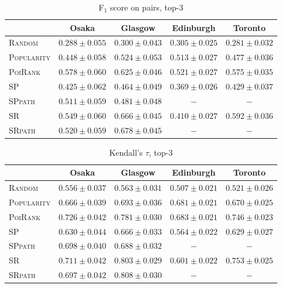 \begin{table*}[t]
\caption{F$_1$ score on pairs, top-3}
\label{tab:pf1}
\centering
\begin{tabular}{l|cccc} \hline
 & Osaka & Glasgow & Edinburgh & Toronto \\ \hline
\textsc{Random} & $0.288\pm0.055$ & $0.300\pm0.043$ & $0.305\pm0.025$ & $0.281\pm0.032$ \\
\textsc{Popularity} & $0.448\pm0.058$ & $0.524\pm0.053$ & $\mathit{0.513\pm0.027}$ & $0.477\pm0.036$ \\
\textsc{PoiRank} & $\mathbf{0.578\pm0.060}$ & $0.625\pm0.046$ & $\mathbf{0.521\pm0.027}$ & $\mathit{0.575\pm0.035}$ \\
\textsc{SP} & $0.425\pm0.062$ & $0.464\pm0.049$ & $0.369\pm0.026$ & $0.429\pm0.037$ \\
\textsc{SPpath} & $0.511\pm0.059$ & $0.481\pm0.048$ & $-$ & $-$ \\
\textsc{SR} & $\mathit{0.549\pm0.060}$ & $\mathit{0.666\pm0.045}$ & $0.410\pm0.027$ & $\mathbf{0.592\pm0.036}$ \\
\textsc{SRpath} & $0.520\pm0.059$ & $\mathbf{0.678\pm0.045}$ & $-$ & $-$ \\
\hline
\end{tabular}
\end{table*}


\begin{table*}[t]
\caption{Kendall's $\tau$, top-3}
\label{tab:tau}
\centering
\begin{tabular}{l|cccc} \hline
 & Osaka & Glasgow & Edinburgh & Toronto \\ \hline
\textsc{Random} & $0.556\pm0.037$ & $0.563\pm0.031$ & $0.507\pm0.021$ & $0.521\pm0.026$ \\
\textsc{Popularity} & $0.666\pm0.039$ & $0.693\pm0.036$ & $\mathit{0.681\pm0.021}$ & $0.670\pm0.025$ \\
\textsc{PoiRank} & $\mathbf{0.726\pm0.042}$ & $0.781\pm0.030$ & $\mathbf{0.683\pm0.021}$ & $\mathit{0.746\pm0.023}$ \\
\textsc{SP} & $0.630\pm0.044$ & $0.666\pm0.033$ & $0.564\pm0.022$ & $0.629\pm0.027$ \\
\textsc{SPpath} & $0.698\pm0.040$ & $0.688\pm0.032$ & $-$ & $-$ \\
\textsc{SR} & $\mathit{0.711\pm0.042}$ & $\mathit{0.803\pm0.029}$ & $0.601\pm0.022$ & $\mathbf{0.753\pm0.025}$ \\
\textsc{SRpath} & $0.697\pm0.042$ & $\mathbf{0.808\pm0.030}$ & $-$ & $-$ \\
\hline
\end{tabular}
\end{table*}


